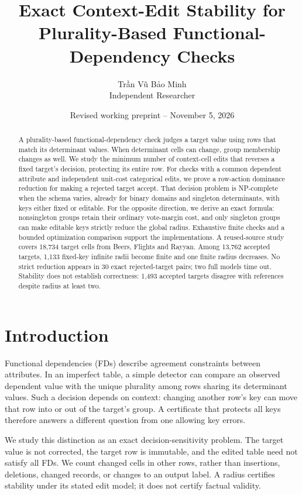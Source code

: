 \documentclass[11pt]{article}
\title{Exact Context-Edit Stability for\\Plurality-Based Functional-Dependency Checks}
\author{Trần Vũ Bảo Minh\\[0.4em]\small Independent Researcher}
\date{Revised working preprint -- November 5, 2026}
\begin{document}
\maketitle
\begin{abstract}
A plurality-based functional-dependency check judges a target value using rows
that match its determinant values. When determinant cells can change, group
membership changes as well. We study the minimum number of context-cell edits
that reverses a fixed target's decision, protecting its entire row. For checks
with a common dependent attribute and independent unit-cost categorical edits,
we prove a row-action dominance reduction for making a rejected target accept.
That decision problem is NP-complete when the schema varies, already for binary
domains and singleton determinants, with keys either fixed or editable.
For the opposite direction, we derive an exact formula: nonsingleton groups
retain their ordinary vote-margin cost, and only singleton groups can make
editable keys strictly reduce the global radius. Exhaustive finite checks and a
bounded optimization comparison support the implementations. A reused-source
study covers 18,734 target cells from Beers, Flights and Rayyan. Among 13,762
accepted targets, 1,133 fixed-key infinite radii become finite and one finite
radius decreases. No strict reduction appears in 30 exact rejected-target
pairs; two full models time out. Stability does not establish correctness:
1,493 accepted targets disagree with references despite radius at least two.
\end{abstract}

\section{Introduction}
Functional dependencies (FDs) describe agreement constraints between attributes.
In an imperfect table, a simple detector can compare an observed dependent
value with the unique plurality among rows sharing its determinant values.
Such a decision depends on context: changing another row's key can move that
row into or out of the target's group. A certificate that protects all keys
therefore answers a different question from one allowing key errors.

We study this distinction as an exact decision-sensitivity problem. The target
value is not corrected, the target row is immutable, and the edited table need
not satisfy all FDs. We count changed cells in other rows, rather than insertions,
deletions, changed records, or changes to an output label. A radius certifies
stability under its stated edit model; it does not certify factual validity.
\end{document}
